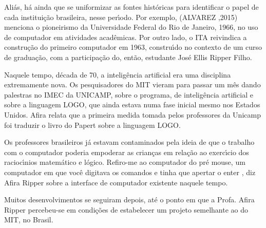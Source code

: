 \documentclass[
12pt,		%
openright,	%
twoside,  %
a4paper,			%
chapter=TITLE,		%
english,			%
french,				%
spanish,			%
brazil				%
]{USPSC-classe/USPSC}
\begin{document}
Ali\'as, h\'a ainda que se uniformizar as fontes hist\'oricas para identificar o papel de cada institui\c{c}\~ao brasileira, nesse per\'{\i}odo. Por exemplo, (ALVAREZ ,2015) menciona o pioneirismo da Universidade Federal do Rio de Janeiro, 1966, no uso de computador em atividades acad\^emicas. Por outro lado, o ITA reivindica a constru\c{c}\~ao do primeiro computador em 1963, constru\'{\i}do no contexto de um curso de gradua\c{c}\~ao, com a participa\c{c}\~ao do, ent\~ao, estudante Jos\'e Ellis Ripper Filho.

















Naquele tempo, d\'ecada de 70, a intelig\^encia artificial era uma disciplina extremamente nova. Os pesquisadores do MIT vieram para passar um m\^es dando palestras no IMEC da UNICAMP, sobre o programa, de intelig\^encia artificial e sobre a linguagem LOGO, que ainda estava numa fase inicial mesmo nos Estados Unidos. Afira relata que a primeira medida tomada pelos professores da Unicamp foi traduzir o livro do Papert sobre a linguagem LOGO.

















Os professores brasileiros j\'a estavam contaminados pela ideia de que o trabalho com o computador poderia empoderar as crian\c{c}as em rela\c{c}\~ao ao exerc\'{\i}cio dos racioc\'{\i}nios matem\'atico e l\'ogico. \textquotedbl Refiro-me ao computador do pr\'e mouse, um computador em que voc\^e digitava os comandos e tinha que apertar o enter \textquotedbl , diz Afira Ripper sobre a interface de computador existente naquele tempo.

















Muitos desenvolvimentos se seguiram depois, at\'e o ponto em que a Profa. Afira Ripper percebeu-se em condi\c{c}\~oes de estabelecer um projeto semelhante ao do MIT, no Brasil.
\end{document}
